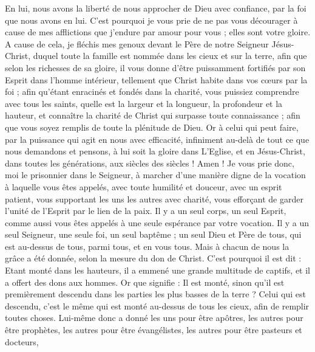 \begin{multicols}{2}
En lui, nous avons la liberté de nous approcher de Dieu avec confiance, par la foi que nous avons en lui.
C'est pourquoi je vous prie de ne pas vous décourager à cause de mes afflictions que j’endure par amour pour vous ; elles sont votre gloire.
A cause de cela, je fléchis mes genoux devant le Père de notre Seigneur Jésus-Christ,
duquel toute la famille est nommée dans les cieux et sur la terre,
afin que selon les richesses de sa gloire, il vous donne d'être puissamment fortifiés par son Esprit dans l'homme intérieur,
tellement que Christ habite dans vos cœurs par la foi ; afin qu’étant enracinés et fondés dans la charité,
vous puissiez comprendre avec tous les saints, quelle est la largeur et la longueur, la profondeur et la hauteur,
et connaître la charité de Christ qui surpasse toute connaissance ; afin que vous soyez remplis de toute la plénitude de Dieu.
Or à celui qui peut faire, par la puissance qui agit en nous avec efficacité, infiniment au-delà de tout ce que nous demandons et pensons,
à lui soit la gloire dans L’Eglise, et en Jésus-Christ, dans toutes les générations, aux siècles des siècles ! Amen !
\VerseOne{}Je vous prie donc, moi le prisonnier dans le Seigneur, à marcher d'une manière digne de la vocation à laquelle vous êtes appelés,
avec toute humilité et douceur, avec un esprit patient, vous supportant les uns les autres avec charité,
vous efforçant de garder l'unité de l'Esprit par le lien de la paix.
Il y a un seul corps, un seul Esprit, comme aussi vous êtes appelés à une seule espérance par votre vocation.
Il y a un seul Seigneur, une seule foi, un seul baptême ;
un seul Dieu et Père de tous, qui est au-dessus de tous, parmi tous, et en vous tous.
Mais à chacun de nous la grâce a été donnée, selon la mesure du don de Christ.
C'est pourquoi il est dit : Etant monté dans les hauteurs, il a emmené une grande multitude de captifs, et il a offert des dons aux hommes.
Or que signifie : Il est monté, sinon qu’il est premièrement descendu dans les parties les plus basses de la terre ?
Celui qui est descendu, c'est le même qui est monté au-dessus de tous les cieux, afin de remplir toutes choses.
Lui-même donc a donné les uns pour être apôtres, les autres pour être prophètes, les autres pour être évangélistes, les autres pour être pasteurs et docteurs,

\end{multicols}
